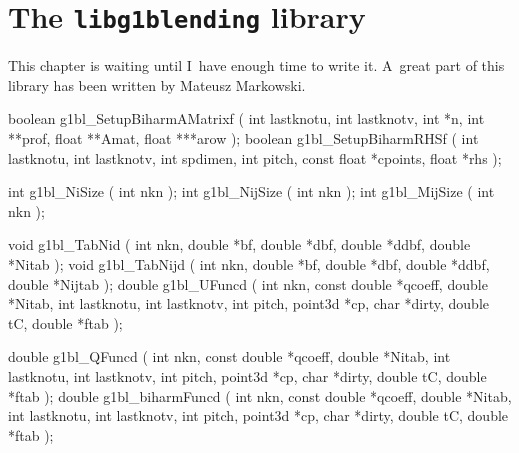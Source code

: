 

\chapter{The \texttt{libg1blending} library}

This chapter is waiting until I~have enough time to write it. A~great part
of this library has been written by Mateusz Markowski.

\begin{listingC}
boolean g1bl_SetupBiharmAMatrixf ( int lastknotu, int lastknotv,
                   int *n, int **prof, float **Amat, float ***arow );
boolean g1bl_SetupBiharmRHSf ( int lastknotu, int lastknotv,
                        int spdimen, int pitch, const float *cpoints,
                        float *rhs );
\end{listingC}

\begin{listingC}
int g1bl_NiSize ( int nkn );
int g1bl_NijSize ( int nkn );
int g1bl_MijSize ( int nkn );
\end{listingC}

\begin{listingC}
void g1bl_TabNid ( int nkn, double *bf, double *dbf, double *ddbf,
                   double *Nitab );
void g1bl_TabNijd ( int nkn, double *bf, double *dbf, double *ddbf,
                    double *Nijtab );
double g1bl_UFuncd ( int nkn, const double *qcoeff, double *Nitab,
                 int lastknotu, int lastknotv, int pitch, point3d *cp,
                 char *dirty,
                 double tC, double *ftab );
\end{listingC}

\begin{listingC}
double g1bl_QFuncd ( int nkn, const double *qcoeff, double *Nitab,
               int lastknotu, int lastknotv, int pitch, point3d *cp,
               char *dirty,
               double tC, double *ftab );
double g1bl_biharmFuncd ( int nkn, const double *qcoeff,
               double *Nitab,
               int lastknotu, int lastknotv, int pitch, point3d *cp,
               char *dirty,
               double tC, double *ftab );
\end{listingC}


